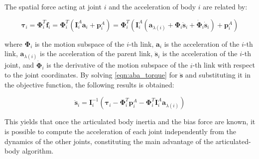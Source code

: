 The spatial force acting at joint $i$ and the acceleration of body $i$ are related by:

\begin{equation}
    \boldsymbol{\tau} _i = \boldsymbol{\Phi} ^T _i \mathbf{f} _i = \boldsymbol{\Phi} ^T _i (\mathbf{I} _i ^A \mathbf{a} _i + \mathbf{p} ^A _i) = \boldsymbol{\Phi} ^T _i (\mathbf{I} _i ^A (\mathbf{a} _{\lambda(i)} + \boldsymbol{\Phi} _i \ddot{\mathbf{s}} _i + \dot{\boldsymbol{\Phi}} _i \dot{\mathbf{s}} _i)+ \mathbf{p} ^A _i)
    \label{eqn:aba_torque}
\end{equation}

where $\boldsymbol{\Phi} _i$ is the motion subspace of the $i$-th link, $\mathbf{a} _i$ is the acceleration of the $i$-th link, $\mathbf{a} _{\lambda(i)}$ is the acceleration of the parent link, $\ddot{\mathbf{s}} _i$ is the acceleration of the $i$-th joint, and $\dot{\boldsymbol{\Phi}} _i$ is the derivative of the motion subspace of the $i$-th link with respect to the joint coordinates.
By solving \cref{eqn:aba_torque} for $\ddot{\mathbf{s}}$ and substituting it in the objective function, the following results is obtained:

\begin{equation}
    \ddot{\mathbf{s}} _i = \mathbf{I} _i ^{-1} (\boldsymbol{\tau} _i - \boldsymbol{\Phi} ^T _i \mathbf{p} ^A _i - \boldsymbol{\Phi} ^T _i \mathbf{I} _i ^A \mathbf{a} _{\lambda(i)})
\end{equation}

This yields that once the articulated body inertia and the bias force are known, it is possible to compute the acceleration of each joint independently from the dynamics of the other joints, constituting the main advantage of the articulated-body algorithm.

